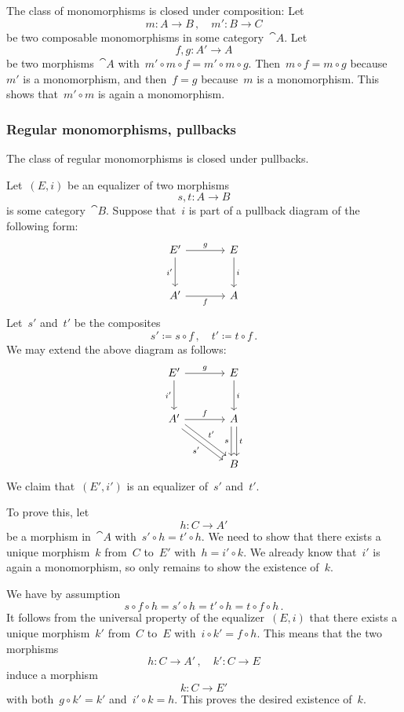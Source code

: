 The class of monomorphisms is closed under composition:
Let
\[
	m \colon A \to B \,,
	\quad
	m' \colon B \to C
\]
be two composable monomorphisms in some category~$\cat{A}$.
Let
\[
	f, g \colon A' \to A
\]
be two morphisms~$\cat{A}$ with~$m' ∘ m ∘ f = m' ∘ m ∘ g$.
Then~$m ∘ f = m ∘ g$ because~$m'$ is a monomorphism, and then~$f = g$ because~$m$ is a monomorphism.
This shows that~$m' ∘ m$ is again a monomorphism.



\subsubsection*{Regular monomorphisms, pullbacks}

The class of regular monomorphisms is closed under pullbacks.

Let~$(E, i)$ be an equalizer of two morphisms
\[
	s, t \colon A \to B
\]
is some category~$\cat{B}$.
Suppose that~$i$ is part of a pullback diagram of the following form:
\[
	\begin{tikzcd}[sep = large]
		E'
		\arrow{r}[above]{g}
		\arrow{d}[left]{i'}
		&
		E
		\arrow{d}[right]{i}
		\\
		A'
		\arrow{r}[below]{f}
		&
		A
	\end{tikzcd}
\]
Let~$s'$ and~$t'$ be the composites
\[
	s' ≔ s ∘ f \,,
	\quad
	t' ≔ t ∘ f \,.
\]
We may extend the above diagram as follows:
\[
	\begin{tikzcd}[sep = large]
		E'
		\arrow{r}[above]{g}
		\arrow{d}[left]{i'}
		&
		E
		\arrow{d}[right]{i}
		\\
		A'
		\arrow{r}[above]{f}
		\arrow[shift right]{dr}[below left]{s'}
		\arrow[shift left]{dr}[above right]{t'}
		&
		A
		\arrow[shift right]{d}[left]{s}
		\arrow[shift left]{d}[right]{t}
		\\
		{}
		&
		B
	\end{tikzcd}
\]
We claim that~$(E', i')$ is an equalizer of~$s'$ and~$t'$.

To prove this, let
\[
	h \colon C \to A'
\]
be a morphism in~$\cat{A}$ with~$s' ∘ h = t' ∘ h$.
We need to show that there exists a unique morphism~$k$ from~$C$ to~$E'$ with~$h = i' ∘ k$.
We already know that~$i'$ is again a monomorphism, so only remains to show the existence of~$k$.

We have by assumption
\[
	s ∘ f ∘ h
	=
	s' ∘ h
	=
	t' ∘ h
	=
	t ∘ f ∘ h \,.
\]
It follows from the universal property of the equalizer~$(E, i)$ that there exists a unique morphism~$k'$ from~$C$ to~$E$ with~$i ∘ k' = f ∘ h$.
This means that the two morphisms
\[
	h \colon C \to A' \,,
	\quad
	k' \colon C \to E
\]
induce a morphism
\[
	k \colon C \to E'
\]
with both~$g ∘ k' = k'$ and~$i' ∘ k = h$.
This proves the desired existence of~$k$.

